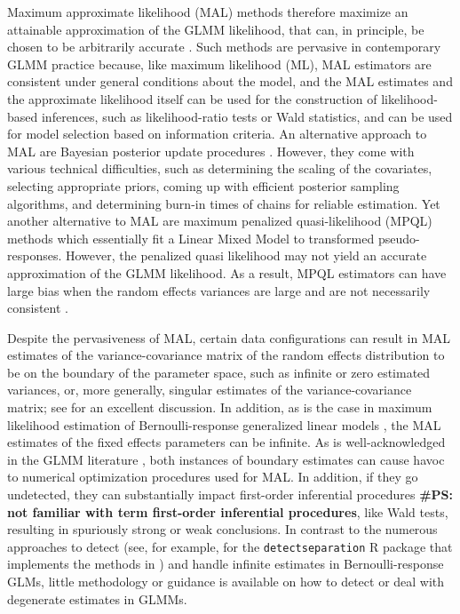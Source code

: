 \documentclass[11pt, a4paper]{article}
\newcommand{\PS}[1]{{\noindent \color{red} \bf \#PS: #1}}
\theoremstyle{example} \newtheorem{example}{Example}[section]
\theoremstyle{theorem} \newtheorem{theorem}{Theorem}[section]
\begin{document}
Maximum approximate likelihood (MAL) methods therefore maximize an attainable
approximation of the GLMM likelihood, that can, in principle, be
chosen to be arbitrarily accurate \citep[see, for example,
][]{raudenbush2000maximum, pinheiro2006efficient}. Such methods are
pervasive in contemporary GLMM practice because, like maximum
likelihood (ML), MAL estimators are consistent under general conditions
about the model, and the MAL estimates and the approximate likelihood
itself can be used for the construction of likelihood-based
inferences, such as likelihood-ratio tests or Wald
statistics, and can be used for model selection based on information criteria. An
alternative approach to MAL are Bayesian posterior update procedures
\citep[see, for example,][]{zhao2006general}. However, they come with
various technical difficulties, such as determining the scaling of the
covariates, selecting appropriate priors, coming up with efficient
posterior sampling algorithms, and determining burn-in times of chains
for reliable estimation. Yet another alternative to MAL are maximum
penalized quasi-likelihood (MPQL) methods \citep{schall1991estimation,
  wolfinger1993generalized, breslow1993approximate} which essentially fit a Linear Mixed Model to transformed pseudo-responses. However, the penalized quasi likelihood may not
yield an accurate approximation of the GLMM likelihood. As a result,
MPQL estimators can have large bias when the random effects
variances are large
\citep{bolker2009generalized,rodriguez1995assessment} and are
not necessarily consistent \citep[Chapter 3.1]{jiang2017asymptotic}.

Despite the pervasiveness of MAL, certain data configurations can
result in MAL estimates of the variance-covariance matrix of the
random effects distribution to be on the boundary of the parameter
space, such as infinite or zero estimated variances, or, more
generally, singular estimates of the variance-covariance matrix; see
\cite{blme} for an excellent discussion. In
addition, as is the case in maximum likelihood estimation of
Bernoulli-response generalized linear models \citep[GLMs; see, for
example][Chapter 4]{mccullagh+nelder:1989}, the MAL estimates of the
fixed effects parameters can be
infinite. As is well-acknowledged in the GLMM literature \citep[see,
for example][]{bolker2009generalized, bolker2018digression,
  pasch2013interspecific}, both instances of boundary estimates can
cause havoc to numerical optimization procedures used for MAL. In
addition, if they go undetected, they can substantially impact
first-order inferential procedures \PS{not familiar with term first-order inferential procedures}, like Wald tests, resulting in
spuriously strong or weak conclusions. In contrast to the
numerous approaches to detect (see, for example,
\citealt{schumacher2021detect} for the \texttt{detectseparation} R
package that implements the methods in \citealt{konis2017linear}) and
handle \citep[see, for example,][]{kosmidis2021jeffreys,
  heinze2002solution, gelman2008weakly, shen2008solution} infinite
estimates in Bernoulli-response GLMs, little methodology or guidance
is available on how to detect or deal with degenerate estimates in
GLMMs.
\end{document}
